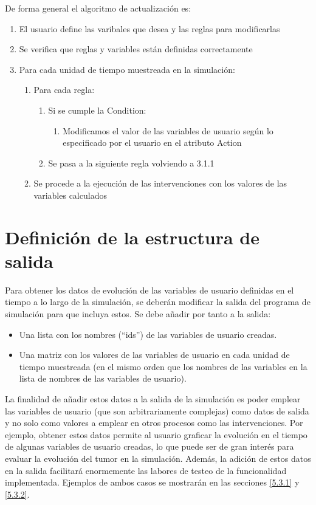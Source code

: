 De forma general el algoritmo de actualización es:

\begin{enumerate}
	\item[1.] El usuario define las varibales que desea y las reglas para modificarlas
	\item[2.] Se verifica que reglas y variables están definidas correctamente
	\item[3.] Para cada unidad de tiempo muestreada en la simulación:
	\begin{enumerate}
		\item[3.1.] Para cada regla:
		\begin{enumerate}
			\item[3.1.1.] Si se cumple la Condition:
				\begin{enumerate}
					\item[3.1.1.1.] Modificamos el valor de las variables de usuario según lo especificado por el usuario en el atributo Action		
				\end{enumerate}
			\item[3.1.2.] Se pasa a la siguiente regla volviendo a 3.1.1	
		\end{enumerate}
		\item[3.2.] Se procede a la ejecución de las intervenciones con los valores de las variables calculados	
	\end{enumerate}		
\end{enumerate}

\section{Definición de la estructura de salida}\label{3.5}

Para obtener los datos de evolución de las variables de usuario definidas en el tiempo a lo largo de la simulación, se deberán modificar la salida del programa de simulación para que incluya estos. Se debe añadir por tanto a la salida:
\begin{itemize}
	\item Una lista con los nombres (``ids'') de las variables de usuario creadas.
	\item Una matriz con los valores de las variables de usuario en cada unidad de tiempo muestreada (en el mismo orden que los nombres de las variables en la lista de nombres de las variables de usuario).	
\end{itemize}

La finalidad de añadir estos datos a la salida de la simulación es poder emplear las variables de usuario (que son arbitrariamente complejas) como datos de salida y no solo como valores a emplear en otros procesos como las intervenciones. Por ejemplo, obtener estos datos permite al usuario graficar la evolución en el tiempo de algunas variables de usuario creadas, lo que puede ser de gran interés para evaluar la evolución del \gls{tumor} en la simulación. Además, la adición de estos datos en la salida facilitará enormemente las labores de testeo de la funcionalidad implementada.	Ejemplos de ambos casos se mostrarán en las secciones \ref{5.3.1} y \ref{5.3.2}.



